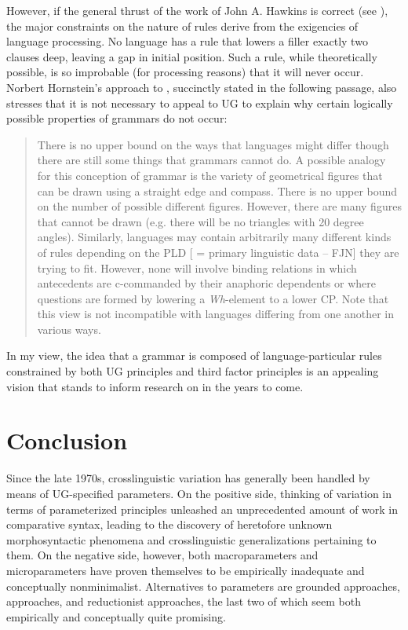\documentclass[output=paper,
modfonts
]{LSP/langsci}
\begin{document}
However, if the general thrust of the work of John A. Hawkins is correct
(see \citealt{hawkins1994,hawkins2004,hawkins2014}), the major constraints on the nature of
rules derive from the exigencies of language processing. No language has
a rule that lowers a filler exactly two clauses deep, leaving a gap in
initial position. Such a rule, while theoretically possible, is so
improbable (for processing reasons) that it will never occur. Norbert
Hornstein's approach to , succinctly stated in the following
passage, also stresses that it is not necessary to appeal to UG to
explain why certain logically possible properties of grammars do not
occur:

\begin{quote}
There is no upper bound on the ways that languages might differ though
there are still some things that grammars cannot do. A possible analogy
for this conception of grammar is the variety of geometrical figures
that can be drawn using a straight edge and compass. There is no upper
bound on the number of possible different figures. However, there are
many figures that cannot be drawn (e.g. there will be no triangles with
20 degree angles). Similarly, languages may contain arbitrarily many
different kinds of rules depending on the PLD {[} = primary linguistic
data  --  FJN{]} they are trying to fit. However, none will involve
binding relations in which antecedents are c-commanded by their
anaphoric dependents or where questions are formed by lowering a
\emph{Wh}-element to a lower CP. Note that this view is not incompatible
with languages differing from one another in various ways. \citep[167]{hornstein2009}
\end{quote}

In my view, the idea that a grammar is composed of language-particular
rules constrained by both UG principles and third factor principles is
an appealing vision that stands to inform research on  in the years to come.

\section{Conclusion}
Since the late 1970s, crosslinguistic variation has generally been
handled by means of UG-specified parameters. On the positive side,
thinking of variation in terms of parameterized principles unleashed an
unprecedented amount of work in comparative syntax, leading to the
discovery of heretofore unknown morphosyntactic phenomena and
crosslinguistic generalizations pertaining to them. On the negative
side, however, both macroparameters and microparameters have proven
themselves to be empirically inadequate and conceptually nonminimalist.
Alternatives to parameters are grounded approaches, 
approaches, and reductionist approaches, the last two of which seem both
empirically and conceptually quite promising.
\end{document}
